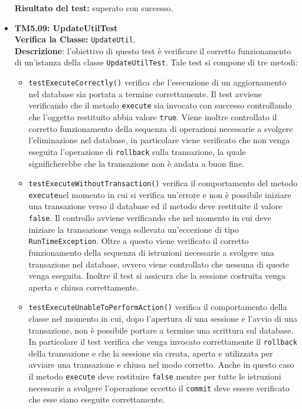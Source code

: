 \begin{itemize}
\begin{itemize}
\end{itemize}
\textbf{Risultato del test:} superato con successo.


\item \textbf{TM5.09: UpdateUtilTest}\\
\textbf{Verifica la Classe:} \texttt{UpdateUtil}.\\
\textbf{Descrizione}: l'obiettivo di questo test è verificare il corretto funzionamento di un'istanza della classe \texttt{UpdateUtilTest}.
Tale test si compone di tre metodi:
\begin{itemize}
\item \texttt{testExecuteCorrectly()} 
verifica che l'esecuzione di un aggiornamento nel database sia portata a termine correttamente. Il test avviene verificando che il metodo \texttt{execute} sia invocato con successo controllando che l'oggetto restituito abbia valore \texttt{true}. Viene inoltre controllato il corretto funzionamento della sequenza di operazioni necessarie a svolgere l'eliminazione nel database, in particolare viene verificato che non venga eseguita l'operazione di \texttt{rollback} sulla transazione, la quale significherebbe che la transazione non è andata a buon fine.

\item \texttt{testExecuteWithoutTransaction()}  verifica il comportamento del metodo \texttt{execute}nel momento in cui si verifica un'errore e non è possibile iniziare una transazione verso il database ed il metodo deve restituite il valore \texttt{false}. Il controllo avviene verificando che nel momento in cui deve iniziare la transazione venga sollevata un'eccezione di tipo \texttt{RunTimeException}. Oltre a questo viene verificato il corretto funzionamento della sequenza di istruzioni necessarie a svolgere una transazione nel database, ovvero viene controllato che nessuna di queste venga eseguita. Inoltre il test si assicura che la sessione costruita venga aperta e chiusa correttamente.

\item \texttt{testExecuteUnableToPerformAction()} verifica il comportamento della classe nel momento in cui, dopo l'apertura di una sessione e l'avvio di una transazione, non è possibile portare a termine una scrittura sul database. In particolare il test verifica che venga invocato correttamente il \texttt{rollback} della transazione e che la sessione sia creata, aperta e utilizzata per avviare una transazione e chiusa nel modo corretto. Anche in questo caso il metodo \texttt{execute} deve restituire \texttt{false} mentre per tutte le istruzioni necessarie a svolgere l'operazione eccetto il \texttt{commit} deve essere verificato che esse siano eseguite correttamente.


\end{itemize}
\end{itemize}
